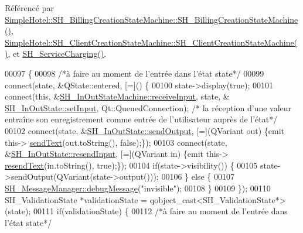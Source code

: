 Référencé par \hyperlink{classSimpleHotel_1_1SH__BillingCreationStateMachine_a8c7d39e11d0ced1fd9c27a5550465b86}{Simple\-Hotel\-::\-S\-H\-\_\-\-Billing\-Creation\-State\-Machine\-::\-S\-H\-\_\-\-Billing\-Creation\-State\-Machine()}, \hyperlink{classSimpleHotel_1_1SH__ClientCreationStateMachine_a301eb77d9ad72102d5fa8952980cf8a3}{Simple\-Hotel\-::\-S\-H\-\_\-\-Client\-Creation\-State\-Machine\-::\-S\-H\-\_\-\-Client\-Creation\-State\-Machine()}, et \hyperlink{classSimpleHotel_1_1SH__ServiceCharging_ae82c86c7e955f0dc93cdfc3603789b87}{S\-H\-\_\-\-Service\-Charging()}.


\begin{DoxyCode}
00097 \{
00098     \textcolor{comment}{/*à faire au moment de l'entrée dans l'état state*/}
00099     connect(state, &QState::entered, [=]() \{
00100         state->display(\textcolor{keyword}{true});
00101         connect(\textcolor{keyword}{this}, &\hyperlink{classSimpleHotel_1_1SH__InOutStateMachine_a17482446bbf0327e84feb5d6a1a612f0}{SH\_InOutStateMachine::receiveInput}, state, &
      \hyperlink{classSimpleHotel_1_1SH__InOutState_a30d45824ca3c749427ac8d40479cf072}{SH\_InOutState::setInput}, Qt::QueuedConnection); \textcolor{comment}{/* la réception d'une valeur
       entraîne son enregistrement comme entrée de l'utilisateur auprès de l'état*/}
00102         connect(state, &\hyperlink{classSimpleHotel_1_1SH__InOutState_a6f39ba3a9682ece4a0d2c96e8f8983a0}{SH\_InOutState::sendOutput}, [=](QVariant out) \{emit this->
      \hyperlink{classSimpleHotel_1_1SH__InOutStateMachine_ae81d4a51fcd3277ebfc11af978b74c0b}{sendText}(out.toString(), \textcolor{keyword}{false});\});
00103         connect(state, &\hyperlink{classSimpleHotel_1_1SH__InOutState_ab259648430e9e6e0667e79398c68c0d9}{SH\_InOutState::resendInput}, [=](QVariant in) \{emit this->
      \hyperlink{classSimpleHotel_1_1SH__InOutStateMachine_a5db6f59d446182ab9f10e0ccb0399915}{resendText}(in.toString(), \textcolor{keyword}{true});\});
00104         \textcolor{keywordflow}{if}(state->visibility()) \{
00105             state->sendOutput(QVariant(state->output()));
00106         \} \textcolor{keywordflow}{else} \{
00107             \hyperlink{classSimpleHotel_1_1SH__MessageManager_ad680f823897b7bf70e46ee18326c08b2}{SH\_MessageManager::debugMessage}(\textcolor{stringliteral}{"invisible"});
00108         \}
00109     \});
00110     SH\_ValidationState *validationState = qobject\_cast<SH\_ValidationState*>(state);
00111     \textcolor{keywordflow}{if}(validationState) \{
00112         \textcolor{comment}{/*à faire au moment de l'entrée dans l'état state*/}

\end{DoxyCode}
